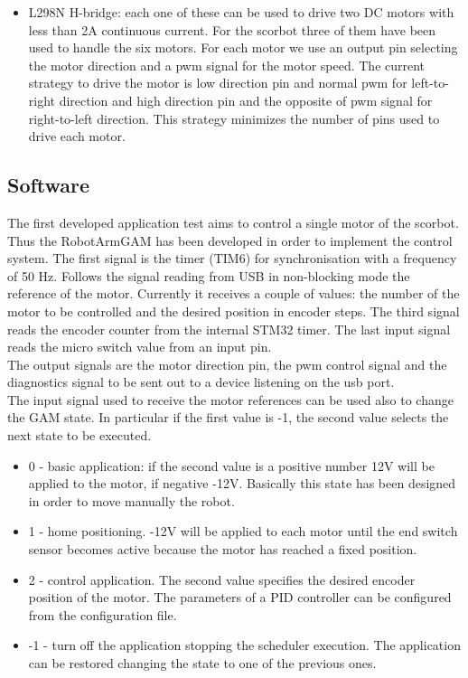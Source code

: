 \begin{itemize}
\item L298N H-bridge: each one of these can be used to drive two DC motors with less than 2A continuous current. For the scorbot three of them have been used to handle the six motors. For each motor we use an output pin selecting the motor direction and a pwm signal for the motor speed. The current strategy to drive the motor is low direction pin and normal pwm for left-to-right direction and high direction pin and the opposite of pwm signal for right-to-left direction. This strategy minimizes the number of pins used to drive each motor. 
 \end{itemize}
 
\subsection{Software}
 The first developed application test aims to control a single motor of the scorbot. Thus the RobotArmGAM has been developed in order to implement the control system. The first signal is the timer (TIM6) for synchronisation with a frequency of 50 Hz. Follows the signal reading from USB in non-blocking mode the reference of the motor. Currently it receives a couple of values: the number of the motor to be controlled and the desired position in encoder steps. The third signal reads the encoder counter from the internal STM32 timer. The last input signal reads the micro switch value from an input pin.\\
 The output signals are the motor direction pin, the pwm control signal and the diagnostics signal to be sent out to a device listening on the usb port.\\
 The input signal used to receive the motor references can be used also to change the GAM state. In particular if the first value is -1, the second value selects the next state to be executed.
 \begin{itemize}
 \item 0 - basic application: if the second value is a positive number 12V will be applied to the motor, if negative -12V. Basically this state has been designed in order to move manually the robot.
 \item 1 - home positioning. -12V will be applied to each motor until the end switch sensor becomes active because the motor has reached a fixed position.
 \item 2 - control application. The second value specifies the desired encoder position of the motor. The parameters of a PID controller can be configured from the configuration file.
 \item -1 - turn off the application stopping the scheduler execution. The application can be restored changing the state to one of the previous ones.
 \end{itemize}

